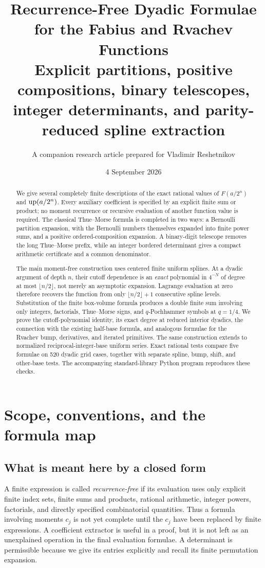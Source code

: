 \documentclass[11pt,oneside]{article}
\title{\bfseries Recurrence-Free Dyadic Formulae\\for the Fabius and Rvachev Functions\\[0.5em]
\large Explicit partitions, positive compositions, binary telescopes,\\integer determinants, and parity-reduced spline extraction}
\author{A companion research article prepared for Vladimir Reshetnikov}
\date{4 September 2026}
\theoremstyle{definition}\newtheorem{definition}[theorem]{Definition}
\theoremstyle{remark}\newtheorem{remark}[theorem]{Remark}
\begin{document}
\maketitle
\begin{abstract}
We give several completely finite descriptions of the exact rational values of
$F(a/2^n)$ and $\operatorname{up}(a/2^n)$. Every auxiliary coefficient is specified by an explicit
finite sum or product; no moment recurrence or recursive evaluation of another
function value is required. The classical Thue--Morse formula is completed in two
ways: a Bernoulli partition expansion, with the Bernoulli numbers themselves
expanded into finite power sums, and a positive ordered-composition expansion.
A binary-digit telescope removes the long Thue--Morse prefix, while an integer
bordered determinant gives a compact arithmetic certificate and a common
denominator.

The main moment-free construction uses centered finite uniform splines. At a
dyadic argument of depth $n$, their cutoff dependence is an \emph{exact}
polynomial in $4^{-N}$ of degree at most $\lfloor n/2\rfloor$, not merely an
asymptotic expansion. Lagrange evaluation at zero therefore recovers the function
from only $\lfloor n/2\rfloor+1$ consecutive spline levels. Substitution of the
finite box-volume formula produces a double finite sum involving only integers,
factorials, Thue--Morse signs, and $q$-Pochhammer symbols at $q=1/4$.
We prove the cutoff-polynomial identity, its exact degree at reduced interior
dyadics, the connection with the existing half-base formula, and analogous
formulae for the Rvachev bump, derivatives, and iterated primitives. The same
construction extends to normalized reciprocal-integer-base uniform series.
Exact rational tests compare five formulae on 520 dyadic grid cases, together
with separate spline, bump, shift, and other-base tests. The accompanying
standard-library Python program reproduces these checks.
\end{abstract}
\clearpage
\begingroup\small
\tableofcontents
\endgroup
\newpage

\section{Scope, conventions, and the formula map}
\label{sec:scope}

\subsection{What is meant here by a closed form}
A finite expression is called \emph{recurrence-free} if its evaluation uses only
explicit finite index sets, finite sums and products, rational arithmetic,
integer powers, factorials, and directly specified combinatorial quantities.
Thus a formula involving moments $c_j$ is not yet complete until the $c_j$ have
been replaced by finite expressions. A coefficient extractor is useful in a
proof, but it is not left as an unexplained operation in the final evaluation
formulae. A determinant is permissible because we give its entries explicitly
and recall its finite permutation expansion.
\end{document}
